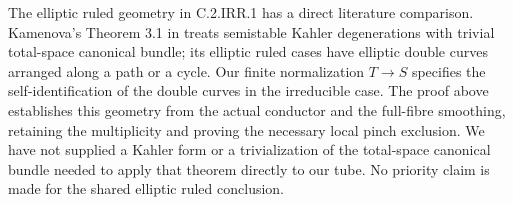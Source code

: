 The elliptic ruled geometry in C.2.IRR.1 has a direct literature
comparison. Kamenova's Theorem 3.1 in \cite{KamenovaTori} treats
semistable Kahler degenerations with trivial total-space canonical
bundle; its elliptic ruled cases have elliptic double curves arranged
along a path or a cycle. Our finite normalization $T\to S$ specifies
the self-identification of the double curves in the irreducible case.
The proof above establishes this geometry from the actual conductor
and the full-fibre smoothing, retaining the multiplicity and proving
the necessary local pinch exclusion. We have not supplied a Kahler
form or a trivialization of the total-space canonical bundle needed
to apply that theorem directly to our tube. No priority claim is
made for the shared elliptic ruled conclusion.




